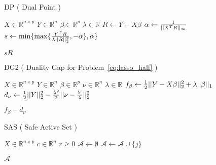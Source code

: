 \documentclass[letterpaper,11pt]{article}
\begin{document}
\FloatBarrier
\begin{algorithm}[!htbp]
  \caption{DP ( Dual Point ) }
  \begin{algorithmic}[1]
  \Statex
  \Input{}
  \Statex $X \in \mathbb{R}^{n \times p} $ 
  \Statex $Y \in \mathbb{R}^n$  
  \Statex $\beta \in \mathbb{R}^p$  
  \Statex $\lambda \in \mathbb{R}$  
    \State $R \gets Y - X \beta $
    \State $\alpha \gets \frac{1}{ \lvert \lvert  X^TR  \rvert \rvert_{\infty} }$
    \State $s \gets \min \{ \max \{ \frac{Y^TR}{\lambda\lvert \lvert R \rvert \rvert_2^2}, -\alpha \}, \alpha \}$
  \end{algorithmic}
  \Return $sR$
\end{algorithm}
\FloatBarrier

\FloatBarrier
\begin{algorithm}[!htbp]
  \caption{DG2 ( Duality Gap for Problem~\ref{eq:lasso_half} ) }
  \begin{algorithmic}[1]
  \Statex
  \Input{}
  \Statex $X \in \mathbb{R}^{n \times p} $ 
  \Statex $Y \in \mathbb{R}^n$  
  \Statex $\beta \in \mathbb{R}^p$  
  \Statex $\nu \in \mathbb{R}^n$  
  \Statex $\lambda \in \mathbb{R}$  
    \State $f_{\beta} \gets \frac{1}{2}\lvert \lvert  Y - X \beta  \rvert \rvert_2^2 + \lambda \lvert \lvert  \beta  \rvert \rvert_1$
    \State $d_{\nu} \gets \frac{1}{2} \lvert \lvert Y \rvert \rvert_2^2 - \frac{\lambda^2}{2}\lvert \lvert \nu - \frac{Y}{\lambda} \rvert \rvert_2^2 $
  \end{algorithmic}
  \Return $f_{\beta} - d_{\nu}$
\end{algorithm}
\FloatBarrier

\FloatBarrier
\begin{algorithm}[!htbp]
  \caption{SAS ( Safe Active Set ) }
  \begin{algorithmic}[1]
  \Statex
  \Input{}
  \Statex $X \in \mathbb{R}^{n \times p} $ 
  \Statex $c \in \mathbb{R}^n$  
  \Statex $r \geq 0$  
  \State $\mathcal{A} \gets \emptyset$ 
       \State $\mathcal{A}\gets \mathcal{A} \cup \{j\}$
    \EndIf
  \EndFor
    \end{algorithmic}
  \Return $\mathcal{A}$
\end{algorithm}
\FloatBarrier
\end{document}
